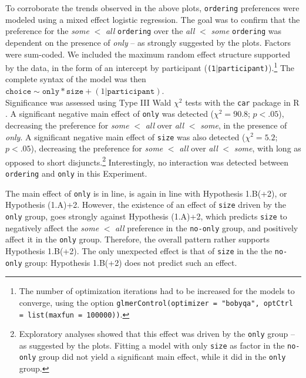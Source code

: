To corroborate the trends observed in the above plots, \texttt{ordering} preferences were modeled using a mixed effect logistic regression. The goal was to confirm that the preference for the \textit{some} $<$ \textit{all} \texttt{ordering} over the \textit{all} $<$ \textit{some} \texttt{ordering} was dependent on the presence of \textit{only} -- as strongly suggested by the plots. Factors were sum-coded. We included the maximum random effect structure supported by the data, in the form of an intercept by participant (\texttt{(1$|$participant)}).\footnote{The number of optimization iterations had to be increased for the models to converge, using the option \texttt{glmerControl(optimizer = "bobyqa", optCtrl = list(maxfun = 100000))}.} The complete syntax of the model was then $\texttt{choice} \sim \texttt{only}*\texttt{size} + (1|\texttt{participant})$.\\ %


Significance was assessed using Type III Wald $\chi^2$ tests with the \texttt{car} package in R \citep{Fox2019}. 
A significant negative main effect of \texttt{only} was detected ($\chi^2 = 90.8$; $p<.05$), decreasing the preference for \textit{some} $<$ \textit{all} over \textit{all} $<$ \textit{some}, in the presence of \textit{only}.
A significant negative main effect of \texttt{size} was also detected ($\chi^2 = 5.2$; $p<.05$), decreasing the preference for \textit{some} $<$ \textit{all} over \textit{all} $<$ \textit{some}, with long as opposed to short disjuncts.\footnote{Exploratory analyses showed that this effect was driven by the \texttt{only} group -- as suggested by the plots. Fitting a model with only \texttt{size} as factor in the \texttt{no-only} group did not yield a significant main effect, while it did in the \texttt{only} group.}
Interestingly, no interaction was detected between \texttt{ordering} and \texttt{only} in this Experiment.


The main effect of \texttt{only} is in line, is again in line with Hypothesis 1.B(+2), or Hypothesis (1.A)+2. However, the existence of an effect of \texttt{size} driven by the \texttt{only} group, goes strongly against Hypothesis (1.A)+2, which predicts \texttt{size} to negatively affect the \textit{some} $<$ \textit{all} preference in the \texttt{no-only} group, and positively affect it in the \texttt{only} group. Therefore, the overall pattern rather supports Hypothesis 1.B(+2). The only unexpected effect is that of \texttt{size} in the the \texttt{no-only} group: Hypothesis 1.B(+2) does not predict such an effect.\\

